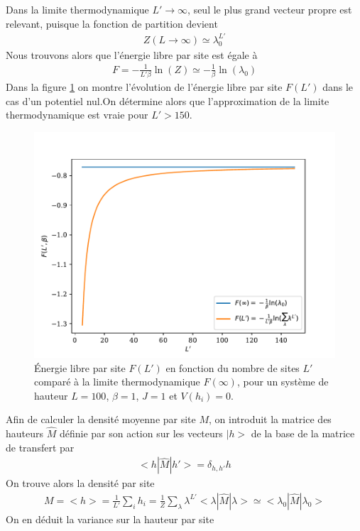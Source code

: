 Dans la limite thermodynamique $L' \to \infty$, seul le plus grand vecteur propre est relevant, puisque la fonction de partition devient
\begin{align}
    Z(L\to \infty) \simeq \lambda_0^{L'}
\end{align}
Nous trouvons alors que l'énergie libre par site est égale à 
\begin{align}
	F =  - \frac{1}{L' \beta} \ln(Z) \simeq - \frac{1}{\beta } \ln( \lambda_0)
	\label{energie-libre-site}
\end{align}
Dans la figure \ref{fig-thermo-libre} on montre l'évolution de l'énergie libre par site $F(L')$ dans le cas d'un potentiel nul.On détermine alors que l'approximation de la limite thermodynamique est vraie pour $L' \greater 150 $.
\begin{figure}
    \centering
	\includegraphics[width=0.7\linewidth]{int-dyn/freeene-thermo-libre.pdf}
	\caption{Énergie libre par site $F(L')$ en fonction du nombre de sites $L'$ comparé à la limite thermodynamique $F(\infty)$, pour un système de hauteur $L=100$, $\beta=1$, $J=1$ et $V(h_i)=0$.}
	\label{fig-thermo-libre}
	\vspace{-0.5cm}
\end{figure}  
Afin de calculer la densité moyenne par site $M$, on introduit la matrice des hauteurs $\hat{M}$ définie par son action sur les vecteurs $|h>$ de la base de la matrice de transfert par
\begin{align}
    <h|\hat{M} |h'> = \delta_{h,h'} h
\end{align}
On trouve alors la densité par site 
\begin{align}
	M = < h > = \frac{1}{L'} \sum_i h_i =  \frac{1}{Z} \sum_\lambda \lambda^{L'} < \lambda | \hat{M} | \lambda > \simeq < \lambda_0 | \hat{M} | \lambda_0 > 
	\label{tm-magnetisation}
\end{align}
On en déduit la variance sur la hauteur par site

